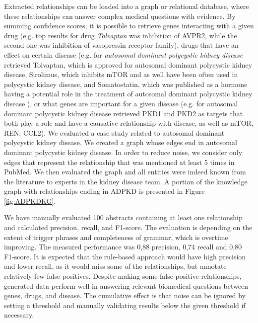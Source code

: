 \documentclass[final,12pt,3p,times,twocolumn,authoryear]{elsarticle}
\begin{document}
Extracted relationships can be loaded into a graph or relational database, where these relationships can answer complex medical questions with evidence. By summing confidence scores, it is possible to retrieve genes interacting with a given drug (e.g. top results for drug \textit{Tolvaptan} was inhibition of AVPR2, while the second one was inhibition of vasopressin receptor family), drugs that have an effect on certain disease (e.g. for \textit{autosomal dominant polycystic kidney disease} retrieved Tolvaptan, which is approved for autosomal dominant polycystic kidney disease, Sirolimus, which inhibits mTOR and as well have been often used in polycystic kidney disease, and Somatostatin, which was published as a hormone having a potential role in the treatment of autosomal dominant polycystic kidney disease \citep{messchendorp2020somatostatin}), or what genes are important for a given disease (e.g. for autosomal dominant polycystic kidney disease retrieved PKD1 and PKD2 as targets that both play a role and have a causative relationship with disease, as well as mTOR, REN, CCL2). We evaluated a case study related to autosomal dominant polycystic kidney disease. We created a graph whose edges end in autosomal dominant polycystic kidney disease. In order to reduce noise, we consider only edges that represent the relationship that was mentioned at least 5 times in PubMed. We then evaluated the graph and all entities were indeed known from the literature to experts in the kidney disease team. A portion of the knowledge graph with relationships ending in ADPKD is presented in Figure \ref{fig:ADPKDKG}.




 
We have manually evaluated 100 abstracts containing at least one relationship and calculated precision, recall, and F1-score. The evaluation is depending on the extent of trigger phrases and completeness of grammar, which is overtime improving. The measured performance was 0,88 precision, 0,74 recall and 0,80 F1-score. It is expected that the rule-based approach would have high precision and lower recall, as it would miss some of the relationships, but annotate relatively few false positives. Despite making some false positive relationships, generated data perform well in answering relevant biomedical questions between genes, drugs, and disease. The cumulative effect is that noise can be ignored by setting a threshold and manually validating results below the given threshold if necessary. 
\end{document}
